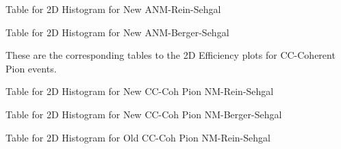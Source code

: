 \documentclass[11pt]{article}
\begin{document}
\newpage
\begin{landscape}
\begin{table}
\centering
\caption{Table for 2D Histogram for New ANM-Rein-Sehgal}
\begin{adjustbox}{width=\paperwidth}
\end{adjustbox}
\end{table}
\end{landscape}

\newpage
\begin{landscape}
\begin{table}
\centering
\caption{Table for 2D Histogram for New ANM-Berger-Sehgal}
\begin{adjustbox}{width=\paperwidth}
\end{adjustbox}
\end{table}
\end{landscape}





These are the corresponding tables to the 2D Efficiency plots for CC-Coherent Pion events.

\newpage
\begin{landscape}
\begin{table}
\centering
\caption{Table for 2D Histogram for New CC-Coh Pion NM-Rein-Sehgal}
\begin{adjustbox}{width=\paperwidth}
\end{adjustbox}
\end{table}
\end{landscape}

\newpage
\begin{landscape}
\begin{table}
\centering
\caption{Table for 2D Histogram for New CC-Coh Pion NM-Berger-Sehgal}
\begin{adjustbox}{width=\paperwidth}
\end{adjustbox}
\end{table}
\end{landscape}

\newpage
\begin{landscape}
\begin{table}
\centering
\caption{Table for 2D Histogram for Old CC-Coh Pion NM-Rein-Sehgal}
\begin{adjustbox}{width=\paperwidth}
\end{adjustbox}
\end{table}
\end{landscape}
\end{document}
